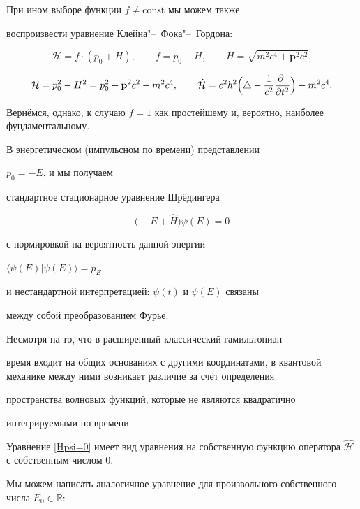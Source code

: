   При ином выборе функции $f\not=\mathrm{const}$ мы можем также

  воспроизвести уравнение Клейна"--~Фока"--~Гордона:

$$

  \mathcal{H}=f\cdot(p_0+H),\qquad f=p_0-H,\qquad

  H=\sqrt{m^2c^4+\mathbf{p}^2c^2},

$$

$$

  \mathcal{H}=p_0^2-H^2=p_0^2-\mathbf{p}^2 c^2-m^2c^4,\qquad

  \mathcal{\hat H}%

  =c^2\hbar^2\Bigl(\triangle-\frac1{c^2}\frac{\partial~}{\partial t^2}\Bigr)-m^2c^4.

$$



  Вернёмся, однако, к случаю $f=1$ как простейшему и, вероятно, наиболее фундаментальному.



  В энергетическом (импульсном по времени) представлении

  $p_0=-E$, и мы получаем

  стандартное стационарное уравнение Шрёдингера

$$

  \bigl(-E+\hat H\bigr)\psi(E)=0

$$

 с нормировкой на вероятность данной энергии

$\langle\psi(E)|\psi(E)\rangle=p_E$

 и нестандартной интерпретацией: $\psi(t)$ и $\psi(E)$ связаны

 между собой преобразованием Фурье.



  Несмотря на то, что в расширенный классический гамильтониан

время входит на общих основаниях с другими координатами, в квантовой механике между ними возникает различие за счёт определения

пространства волновых функций, которые не являются квадратично

интегрируемыми по времени.



  Уравнение \eqref{Hpsi=0} имеет вид уравнения на собственную функцию оператора $\mathcal{\hat H}$ с собственным числом 0.

  Мы можем написать аналогичное уравнение для произвольного собственного числа $E_0\in\mathbb{R}$:


